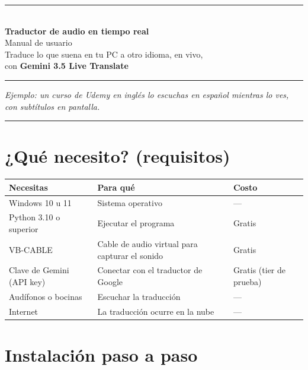 \documentclass[11pt,a4paper]{article}
\begin{document}
\begin{center}
  {\color{indigo}\rule{\textwidth}{2pt}}\\[1.2em]
  {\Huge\bfseries Traductor de audio en tiempo real}\\[0.6em]
  {\Large\color{gristxt} Manual de usuario}\\[1em]
  {\large Traduce lo que suena en tu PC a otro idioma, en vivo,\\
   con \textbf{Gemini 3.5 Live Translate}}\\[1em]
  {\color{indigo}\rule{\textwidth}{2pt}}
\end{center}

\vspace{1em}
\noindent\textit{Ejemplo: un curso de Udemy en inglés lo escuchas en español
mientras lo ves, con subtítulos en pantalla.}

\vspace{1.5em}
\tableofcontents
\vspace{1em}
\hrule
\vspace{1em}

\section{¿Qué necesito? (requisitos)}

\begin{tabularx}{\textwidth}{@{}l Y l@{}}
\toprule
\textbf{Necesitas} & \textbf{Para qué} & \textbf{Costo} \\
\midrule
Windows 10 u 11 & Sistema operativo & --- \\
Python 3.10 o superior & Ejecutar el programa & Gratis \\
VB-CABLE & Cable de audio virtual para capturar el sonido & Gratis \\
Clave de Gemini (API key) & Conectar con el traductor de Google & Gratis (tier de prueba) \\
Audífonos o bocinas & Escuchar la traducción & --- \\
Internet & La traducción ocurre en la nube & --- \\
\bottomrule
\end{tabularx}

\section{Instalación paso a paso}
\end{document}
